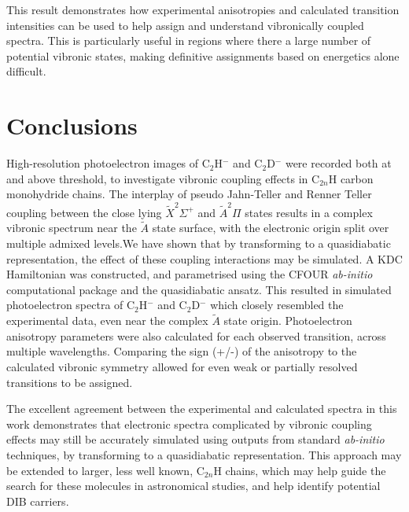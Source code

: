 \documentclass[journal=jpcafh,manuscript=article,layout=onecolumn, 12pt]{achemso}
\begin{document}
This result demonstrates how experimental anisotropies and calculated transition intensities can be used to help assign and understand vibronically coupled spectra. This is particularly useful in regions where there a large number of potential vibronic states, making definitive assignments based on energetics alone difficult.


 
\section{Conclusions} 
High-resolution photoelectron images of C$_2$H$^-$ and C$_2$D$^-$ were recorded both at and above threshold, to investigate vibronic coupling effects in C$_{2n}$H carbon monohydride chains. The interplay of pseudo Jahn-Teller and Renner Teller coupling between the close lying $\tilde{X}^2\Sigma^+$ and $\tilde{A}^2\Pi$ states results in a complex vibronic spectrum near the $\tilde{A}$ state surface, with the electronic origin split over multiple admixed levels.We have shown that by transforming to a quasidiabatic representation, the effect of these coupling interactions may be simulated. A KDC Hamiltonian was constructed, and parametrised using the CFOUR \emph{ab-initio} computational package and the quasidiabatic ansatz. This resulted in simulated photoelectron spectra of C$_2$H$^-$ and C$_2$D$^-$ which closely resembled the experimental data, even near the complex $\tilde{A}$ state origin. Photoelectron anisotropy parameters were also calculated for each observed transition, across multiple wavelengths. Comparing the sign (+/-) of the anisotropy to the calculated vibronic symmetry allowed for even weak or partially resolved transitions to be assigned.

The excellent agreement between the experimental and calculated spectra in this work
demonstrates that electronic spectra complicated by vibronic coupling effects may still be accurately simulated using outputs from standard \emph{ab-initio} techniques, by transforming to a quasidiabatic representation. This approach may be extended to larger, less well known, C$_{2n}$H chains, which may help guide the search for these molecules in astronomical studies, and help identify potential DIB carriers.
 
\end{document}
